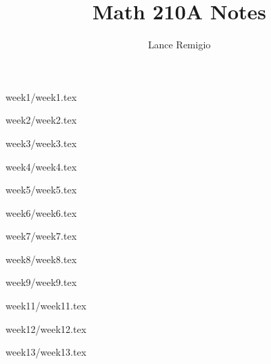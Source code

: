 \documentclass[a4paper]{article}
\title{Math 210A Notes}
\author{Lance Remigio}
\begin{document}
\maketitle


{week1/week1.tex}

{week2/week2.tex}

{week3/week3.tex}

{week4/week4.tex}

{week5/week5.tex}

{week6/week6.tex}

{week7/week7.tex}

{week8/week8.tex} 

{week9/week9.tex}

{week11/week11.tex}

{week12/week12.tex}

{week13/week13.tex}
\end{document}
